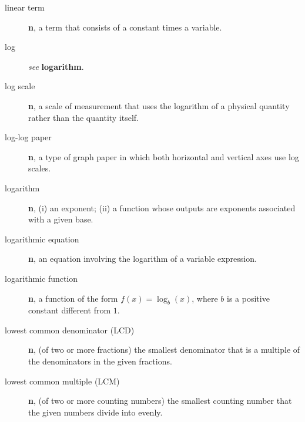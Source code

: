\documentclass[10pt,]{book}
\newcommand{\terminology}[1]{\textbf{#1}}
\theoremstyle{plain}
\theoremstyle{definition}
\theoremstyle{definition}
\theoremstyle{definition}
\numberwithin{equation}{part}
\begin{document}
\begin{description}
\item[{linear term}]\hypertarget{li-661}{}\terminology{n}, a term that consists of a constant times a variable.%
\item[{log}]\hypertarget{li-662}{}\emph{see} \terminology{logarithm}.%
\item[{log scale}]\hypertarget{li-663}{}\terminology{n}, a scale of measurement that uses the logarithm of a physical quantity rather than the quantity itself.%
\item[{log-log paper}]\hypertarget{li-664}{}\terminology{n}, a type of graph paper in which both horizontal and vertical axes use log scales.%
\item[{logarithm}]\hypertarget{li-665}{}\terminology{n}, (i) an exponent; (ii) a function whose outputs are exponents associated with a given base.%
\item[{logarithmic equation}]\hypertarget{li-666}{}\terminology{n}, an equation involving the logarithm of a variable expression.%
\item[{logarithmic function}]\hypertarget{li-667}{}\terminology{n}, a function of the form \(f (x) = \log_b(x)\), where \(b\) is a positive constant different from \(1\).%
\item[{lowest common denominator (LCD)}]\hypertarget{li-668}{}\terminology{n}, (of two or more fractions) the smallest denominator that is a multiple of the denominators in the given fractions.%
\item[{lowest common multiple (LCM)}]\hypertarget{li-669}{}\terminology{n}, (of two or more counting numbers) the smallest counting number that the given numbers divide into evenly.%
\end{description}
%
\typeout{************************************************}
\typeout{************************************************}
\end{document}
